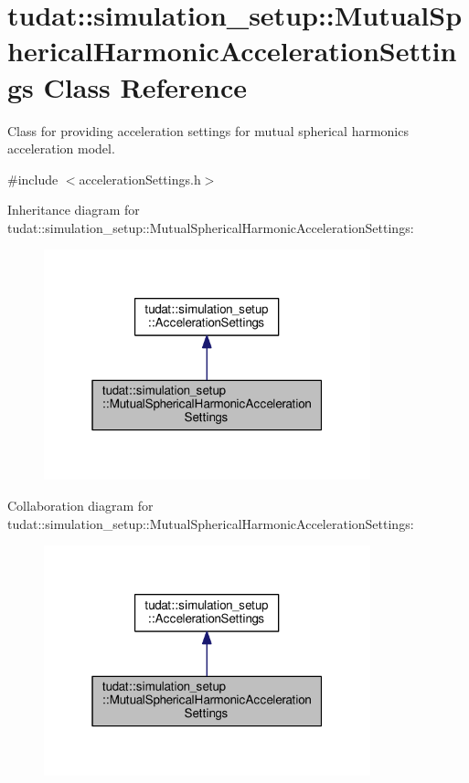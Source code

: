 \hypertarget{classtudat_1_1simulation__setup_1_1MutualSphericalHarmonicAccelerationSettings}{}\section{tudat\+:\+:simulation\+\_\+setup\+:\+:Mutual\+Spherical\+Harmonic\+Acceleration\+Settings Class Reference}
\label{classtudat_1_1simulation__setup_1_1MutualSphericalHarmonicAccelerationSettings}


Class for providing acceleration settings for mutual spherical harmonics acceleration model.  




{\ttfamily \#include $<$acceleration\+Settings.\+h$>$}



Inheritance diagram for tudat\+:\+:simulation\+\_\+setup\+:\+:Mutual\+Spherical\+Harmonic\+Acceleration\+Settings\+:
\nopagebreak
\begin{figure}[H]
\begin{center}
\leavevmode
\includegraphics[width=268pt]{classtudat_1_1simulation__setup_1_1MutualSphericalHarmonicAccelerationSettings__inherit__graph}
\end{center}
\end{figure}


Collaboration diagram for tudat\+:\+:simulation\+\_\+setup\+:\+:Mutual\+Spherical\+Harmonic\+Acceleration\+Settings\+:
\nopagebreak
\begin{figure}[H]
\begin{center}
\leavevmode
\includegraphics[width=268pt]{classtudat_1_1simulation__setup_1_1MutualSphericalHarmonicAccelerationSettings__coll__graph}
\end{center}
\end{figure}
